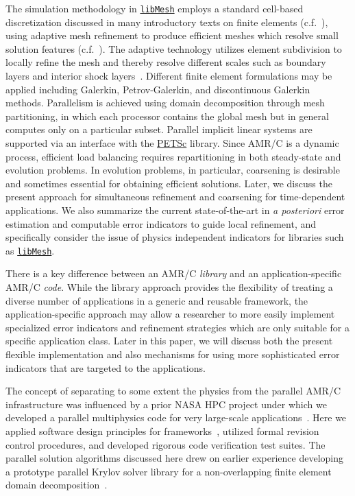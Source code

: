 \documentclass[global,twocolumn,final]{svjour}
\newcommand{\libMesh}{\href{http://libmesh.sourceforge.net}{\texttt{lib\-Mesh}}}
\newcommand{\PETSc}{\href{http://www-unix.mcs.anl.gov/petsc/petsc-2}{PETSc}}
\begin{document}
The simulation methodology in \libMesh{} employs a standard cell-based
discretization discussed in many introductory texts on finite elements
(c.f.~\cite{becker_carey_oden_volume_1}), using adaptive mesh
refinement to produce efficient meshes which resolve small solution
features
(c.f.~\cite{flaherty_paslow_shephard_vasilakis,aearfec_babuska,babuska_rheinboldt_1982}).
The adaptive technology utilizes element subdivision to locally refine
the mesh and thereby resolve different scales such as boundary layers
and interior shock layers~\cite{carey_bail_2004}.  Different finite
element formulations may be applied including Galerkin,
Petrov-Galerkin, and discontinuous Galerkin methods.  Parallelism is
achieved using domain decomposition through mesh partitioning, in
which each processor contains the global mesh but in general computes
only on a particular subset. Parallel implicit linear systems are
supported via an interface with the \PETSc{} library. Since AMR/C is a
dynamic process, efficient load balancing requires repartitioning in
both steady-state and evolution problems.  In evolution problems, in
particular, coarsening is desirable and so\-metimes essential for
obtaining efficient solutions.  Later, we discuss the present approach
for simultaneous refinement and coarsening for time-dependent
applications.  We also summarize the current state-of-the-art in
\emph{a posteriori} error estimation and computable error indicators
to guide local refinement, and specifically consider the issue of
physics independent indicators for libraries such as \libMesh.

There is a key difference between an AMR/C
\emph{library} and an appli\-cation-specific AMR/C \emph{code}.  While
the library approach provides the flexibility of treating a diverse
number of applications in a generic and reusable framework, the
appli\-cation-specific approach may allow a researcher to more easily
implement specialized error indicators and refinement strat\-egies which
are only suitable for a specific application class.
Later in this paper, we
will discuss both the present flexible implementation and also
mechanisms for using more sophisticated error indicators that are
targeted to the applications.

The concept of separating to some extent the physics from the
parallel AMR/C infrastructure was influenced by a prior NASA HPC
project under which we developed a parallel multiphysics code for very
large-scale applications~\cite{hpc00}.  Here we applied software
design principles for frameworks~\cite{GoF}, utilized formal revision
control procedures, and developed rigorous code verification test
suites.  The parallel solution algorithms discussed here drew on earlier
experience developing a prototype parallel Krylov solver library for a
non-overlapping finite element domain decomposition~\cite{PCG96b}.
\end{document}

